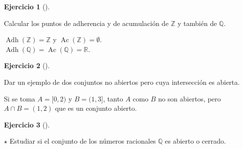 \documentclass[
  spanish,
  a4paper,
]{scrreport}
\theoremstyle{definition}
\newtheorem{exercise}{Ejercicio}[chapter]
\theoremstyle{remark}
\begin{document}
\begin{exercise}[]\protect\hypertarget{exr-particion-interior-exterior-frontera}{}\label{exr-particion-interior-exterior-frontera}

Calcular los puntos de adherencia y de acumulación de \(\mathbb{Z}\) y
también de \(\mathbb{Q}\).

\end{exercise}

\begin{tcolorbox}[enhanced jigsaw, arc=.35mm, bottomrule=.15mm, bottomtitle=1mm, breakable, colback=white, colbacktitle=quarto-callout-tip-color!10!white, colframe=quarto-callout-tip-color-frame, coltitle=black, left=2mm, leftrule=.75mm, opacityback=0, opacitybacktitle=0.6, rightrule=.15mm, title=\textcolor{quarto-callout-tip-color}{\faLightbulb}\hspace{0.5em}{Solución}, titlerule=0mm, toprule=.15mm, toptitle=1mm]

\(\operatorname{Adh}(\mathbb{Z})=\mathbb{Z}\) y
\(\operatorname{Ac}(\mathbb{Z})=\emptyset\).\\
\(\operatorname{Adh}(\mathbb{Q})=\operatorname{Ac}(\mathbb{Q})=\mathbb{R}\).

\end{tcolorbox}

\begin{exercise}[]\protect\hypertarget{exr-ejemplo-conjuntos-abiertos-interseccion-no-abierta}{}\label{exr-ejemplo-conjuntos-abiertos-interseccion-no-abierta}

Dar un ejemplo de dos conjuntos no abiertos pero cuya intersección es
abierta.

\end{exercise}

\begin{tcolorbox}[enhanced jigsaw, arc=.35mm, bottomrule=.15mm, bottomtitle=1mm, breakable, colback=white, colbacktitle=quarto-callout-tip-color!10!white, colframe=quarto-callout-tip-color-frame, coltitle=black, left=2mm, leftrule=.75mm, opacityback=0, opacitybacktitle=0.6, rightrule=.15mm, title=\textcolor{quarto-callout-tip-color}{\faLightbulb}\hspace{0.5em}{Solución}, titlerule=0mm, toprule=.15mm, toptitle=1mm]

Si se toma \(A=[0,2)\) y \(B=(1,3]\), tanto \(A\) como \(B\) no son
abiertos, pero \(A\cap B=(1,2)\) que es un conjunto abierto.

\end{tcolorbox}

\begin{exercise}[]\protect\hypertarget{exr-racionales-no-abierto-cerrado}{}\label{exr-racionales-no-abierto-cerrado}

\(\star\) Estudiar si el conjunto de los números racionales
\(\mathbb{Q}\) es abierto o cerrado.

\end{exercise}
\end{document}
